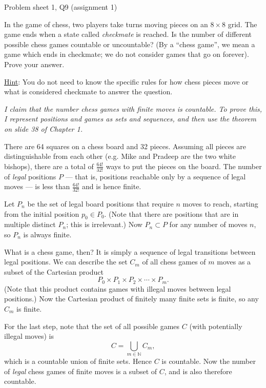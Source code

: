\begin{problem}{Problem sheet 1, Q9 (assignment 1)}{}


    In the game of chess, two players take turns moving pieces on an $8 \times 8$ grid.  The game ends when a state called \textit{checkmate} is reached.  Is the number of different possible chess games countable or uncountable?  (By a ``chess game'', we mean a game which ends in checkmate; we do not consider games that go on forever). Prove your answer.
    
    \underline{Hint}: You do not need to know the specific rules for how chess pieces move or what is considered checkmate to answer the question.

    \tcblower

    \textit{I claim that the number chess games with finite moves is countable. To prove this, I represent positions and games as sets and sequences, and then use the theorem on slide 38 of Chapter 1.}
        
    There are 64 squares on a chess board and 32 pieces. Assuming all pieces are distinguishable from each other (e.g. Mike and Pradeep are the two white bishops), there are a total of $\frac{64!}{32!}$ ways to put the pieces on the board. The number of \textit{legal} positions $P$ --- that is, positions reachable only by a sequence of legal moves --- is less than $\frac{64!}{32!}$ and is hence finite.

    Let $P_n$ be the set of legal board positions that require $n$ moves to reach, starting from the initial position $p_0 \in P_0$. (Note that there are positions that are in multiple distinct $P_n$; this is irrelevant.) Now $P_n \subset P$ for any number of moves $n$, so $P_n$ is always finite.

    What is a chess game, then? It is simply a sequence of legal transitions between legal positions. We can describe the set $C_m$ of all chess games of $m$ moves as a subset of the Cartesian product
        $$ P_0 \times P_1 \times P_2 \times \cdots \times P_m . $$
    (Note that this product contains games with illegal moves between legal positions.) Now the Cartesian product of finitely many finite sets is finite, so any $C_m$ is finite.

    For the last step, note that the set of all possible games $C$ (with potentially illegal moves) is 
        $$ C = \bigcup_{m \in \mathbb{N}} C_m , $$
    which is a countable union of finite sets. Hence $C$ is countable. Now the number of \textit{legal} chess games of finite moves is a subset of $C$, and is also therefore countable.
\end{problem}

